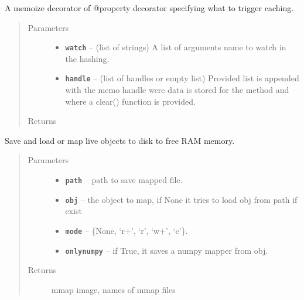 \documentclass[letterpaper,10pt,english]{sphinxmanual}
\begin{document}

\begin{fulllineitems}
\label{RRtoolbox.lib:RRtoolbox.lib.cache.cachedProperty}
A memoize decorator of @property decorator specifying what to trigger caching.
\begin{quote}\begin{description}
\item[{Parameters}] \leavevmode\begin{itemize}
\item {} 
\textbf{\texttt{watch}} -- (list of strings) A list of arguments name to watch in the hashing.

\item {} 
\textbf{\texttt{handle}} -- (list of handles or empty list) Provided list is appended with the memo
handle were data is stored for the method and where a clear() function is provided.

\end{itemize}

\item[{Returns}] \leavevmode


\end{description}\end{quote}

\end{fulllineitems}


\begin{fulllineitems}
\label{RRtoolbox.lib:RRtoolbox.lib.cache.mapper}
Save and load or map live objects to disk to free RAM memory.
\begin{quote}\begin{description}
\item[{Parameters}] \leavevmode\begin{itemize}
\item {} 
\textbf{\texttt{path}} -- path to save mapped file.

\item {} 
\textbf{\texttt{obj}} -- the object to map, if None it tries to load obj from path if exist

\item {} 
\textbf{\texttt{mode}} -- \{None, `r+', `r', `w+', `c'\}.

\item {} 
\textbf{\texttt{onlynumpy}} -- if True, it saves a numpy mapper from obj.

\end{itemize}

\item[{Returns}] \leavevmode
mmap image, names of mmap files

\end{description}\end{quote}

\end{fulllineitems}
\end{document}
